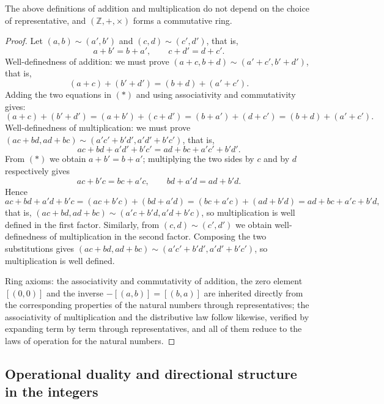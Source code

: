 \begin{proposition}\label{prop:integer_well_defined}
The above definitions of addition and multiplication do not depend on the choice of representative, and $(\mathbb{Z},+,\times)$ forms a commutative ring.
\end{proposition}

\begin{proof}
Let $(a,b) \sim (a',b')$ and $(c,d) \sim (c',d')$, that is,
\[
a+b' = b+a', \qquad c+d' = d+c'. \tag{*}
\]
Well-definedness of addition: we must prove $(a+c, b+d) \sim (a'+c', b'+d')$, that is,
\[
(a+c)+(b'+d') = (b+d)+(a'+c').
\]
Adding the two equations in $(*)$ and using associativity and commutativity gives:
\[
(a+c)+(b'+d') = (a+b')+(c+d') = (b+a')+(d+c') = (b+d)+(a'+c').
\]
Well-definedness of multiplication: we must prove $(ac+bd, ad+bc) \sim (a'c'+b'd', a'd'+b'c')$, that is,
\[
ac + bd + a'd' + b'c' = ad + bc + a'c' + b'd'. \tag{**}
\]
From $(*)$ we obtain $a + b' = b + a'$; multiplying the two sides by $c$ and by $d$ respectively gives
\[
ac + b'c = bc + a'c, \qquad bd + a'd = ad + b'd.
\]
Hence
\[
ac + bd + a'd + b'c = (ac + b'c) + (bd + a'd) = (bc + a'c) + (ad + b'd) = ad + bc + a'c + b'd,
\]
that is, $(ac+bd, ad+bc) \sim (a'c+b'd, a'd+b'c)$, so multiplication is well defined in the first factor. Similarly, from $(c,d) \sim (c',d')$ we obtain well-definedness of multiplication in the second factor. Composing the two substitutions gives $(ac+bd, ad+bc) \sim (a'c'+b'd', a'd'+b'c')$, so multiplication is well defined.

Ring axioms: the associativity and commutativity of addition, the zero element $[(0,0)]$ and the inverse $-[(a,b)] = [(b,a)]$ are inherited directly from the corresponding properties of the natural numbers through representatives; the associativity of multiplication and the distributive law follow likewise, verified by expanding term by term through representatives, and all of them reduce to the laws of operation for the natural numbers.
\end{proof}

\subsection{\texorpdfstring{Operational duality and directional structure in the integers}{Operational duality and directional structure in the integers}}

